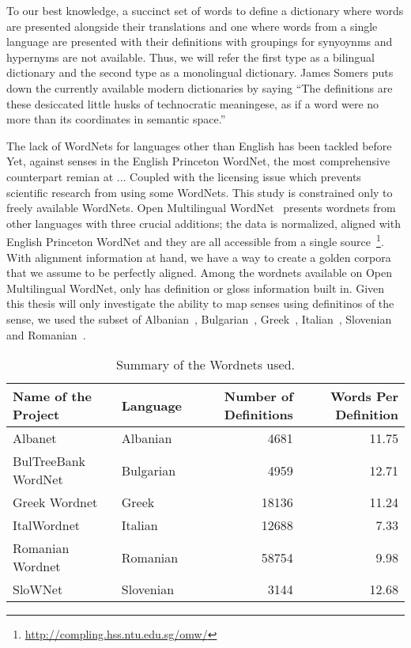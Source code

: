 To our best knowledge, a succinct set of words to define a dictionary where words are presented alongside their translations and one where words from a single language are presented with their definitions with groupings for synyoynms and hypernyms are not available.
Thus, we will refer the first type as a bilingual dictionary and the second type as a monolingual dictionary.
James Somers puts down the currently available modern dictionaries by saying \enquote{The definitions are these desiccated little husks of technocratic meaningese, as if a word were no more than its coordinates in semantic space.}\cite{noauthor_youre_nodate}

The lack of WordNets for languages other than English has been tackled before %
Yet, against %
senses in the English Princeton WordNet, the most comprehensive counterpart remian at ... %
Coupled with the licensing issue which prevents scientific research from using some WordNets.
This study is constrained only to freely available WordNets.
Open Multilingual WordNet~\cite{bond_survey_2012} presents wordnets from other languages with three crucial additions; %
the data is normalized, aligned with English Princeton WordNet and they are all accessible from a single source~\footnote{\url{http://compling.hss.ntu.edu.sg/omw/}}.
With alignment information at hand, we have a way to create a golden corpora that we assume to be perfectly aligned.
Among the %
wordnets available on Open Multilingual WordNet, only %
has definition or gloss information built in.
Given this thesis will only investigate the ability to map senses using definitinos of the sense, we used the subset of Albanian~\cite{ruci_current_2008}, Bulgarian~\cite{simov_constructing_2010}, Greek~\cite{stamou_exploring_2004}, Italian~\cite{pianta_multiwordnet_2002}, Slovenian~\cite{fiser_slownet_2012} and Romanian~\cite{tufis_romanian_2008}.
\begin{table*}[!hbp]
    \begin{center}
        \caption{Summary of the Wordnets used.}\label{tab:summary_table}
        \begin{tabular}{llrr}
            \toprule%
            \textbf{Name of the Project} & \textbf{Language} & \textbf{Number of Definitions} & \textbf{Words Per Definition} \\
            \midrule%
            Albanet & Albanian & 4681 & 11.75 \\
            BulTreeBank WordNet & Bulgarian & 4959 & 12.71 \\
            Greek Wordnet & Greek & 18136 & 11.24 \\
            ItalWordnet & Italian & 12688 & 7.33 \\
            Romanian Wordnet & Romanian & 58754 & 9.98 \\
            SloWNet & Slovenian & 3144 & 12.68 \\
            \bottomrule %
        \end{tabular}
    \end{center}
\end{table*}

